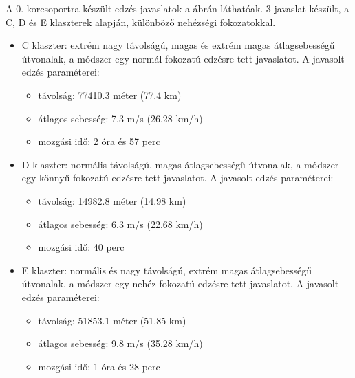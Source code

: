 \noindent A 0. korcsoportra készült edzés javaslatok a  ábrán láthatóak. 3 javaslat készült, a C, D és E klaszterek alapján, különböző nehézségi fokozatokkal. 
\begin{itemize}
	\item C klaszter: extrém nagy távolságú, magas és extrém magas átlagsebességű útvonalak, a módszer egy normál fokozatú edzésre tett javaslatot. A javasolt edzés paraméterei:
	\begin{itemize}
		\item távolság: 77410.3 méter (77.4 km)
		\item átlagos sebesség: 7.3 m/s (26.28 km/h)
		\item mozgási idő: 2 óra és 57 perc
	\end{itemize}
	\item D klaszter: normális távolságú, magas átlagsebességű útvonalak, a módszer egy könnyű fokozatú edzésre tett javaslatot. A javasolt edzés paraméterei:
	\begin{itemize}
		\item távolság: 14982.8 méter (14.98 km)
		\item átlagos sebesség: 6.3 m/s (22.68 km/h)
		\item mozgási idő: 40 perc
	\end{itemize}
	\item E klaszter: normális és nagy távolságú, extrém magas átlagsebességű útvonalak, a módszer egy nehéz fokozatú edzésre tett javaslatot. A javasolt edzés paraméterei:
	\begin{itemize}
		\item távolság: 51853.1 méter (51.85 km)
		\item átlagos sebesség: 9.8 m/s (35.28 km/h)
		\item mozgási idő: 1 óra és 28 perc
	\end{itemize}
\end{itemize}

